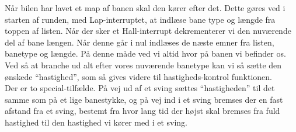 Når bilen har lavet et map af banen skal den kører efter det. Dette gøres ved i starten af runden, med Lap-interruptet, at indlæse bane type og længde fra toppen af listen. Når der sker et Hall-interrupt dekrementerer vi den nuværende del af bane længen. Når denne går i nul indlæses de næste emner fra listen, banetype og længde. På denne måde ved vi altid hvor på banen vi befinder os.
\\
Ved så at branche ud alt efter vores nuværende banetype kan vi så sætte den ønskede ``hastighed'', som så gives videre til hastigheds-kontrol funktionen.
\\
Der er to special-tilfælde. På vej ud af et sving sættes ``hastigheden'' til det samme som på et lige banestykke, og på vej ind i et sving bremses der en fast afstand fra et sving, bestemt fra hvor lang tid der højst skal bremses fra fuld hastighed til den hastighed vi kører med i et sving.



















